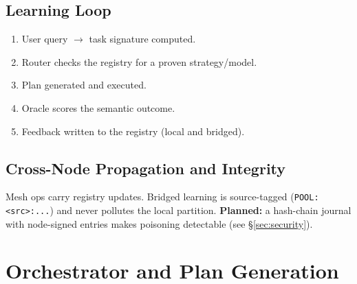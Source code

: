 \documentclass[11pt,a4paper]{article}
\begin{document}
\subsection{Learning Loop}
\begin{enumerate}
    \item User query $\rightarrow$ task signature computed.
    \item Router checks the registry for a proven strategy/model.
    \item Plan generated and executed.
    \item Oracle scores the semantic outcome.
    \item Feedback written to the registry (local and bridged).
\end{enumerate}

\subsection{Cross-Node Propagation and Integrity}
Mesh ops carry registry updates. Bridged learning is source-tagged (\texttt{POOL:<src>:...}) and never pollutes the local partition. \textbf{Planned:} a hash-chain journal with node-signed entries makes poisoning detectable (see \S\ref{sec:security}).

\section{Orchestrator and Plan Generation}
\end{document}
